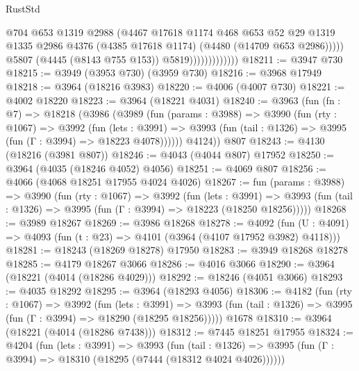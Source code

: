 \begin{lexlean}{RustStd}
\begin{coremodule}
{\begin{coremodule}
{{{{{{{{{{{{{{{{{{{{{{{{{{{{{{{{{{{{{{                                  @704
                                  @653
                                  @1319
                                  @2988
                                  (@4467
                                    @17618
                                    @1174
                                    @468
                                    @653
                                    @52
                                    @29
                                    @1319
                                    @1335
                                    @2986
                                    @4376
                                    (@4385 @17618 @1174)
                                    (@4480 (@14709 @653 @2986)))))
                              @5807
                              (@4445 (@8143 @755 @153))
                              @5819)))))))))))))
@18211 := @3947 @730
@18215 := @3949 (@3953 @730) (@3959 @730)
@18216 := @3968 @17949
@18218 := @3964 (@18216 @3983)
@18220 := @4006 (@4007 @730)
@18221 := @4002 @18220
@18223 := @3964 (@18221 @4031)
@18240 := @3963
    (fun (fn : @7) =>
    @18218
      (@3986
        (@3989
          (fun (params : @3988) =>
          @3990
            (fun (rty : @1067) =>
            @3992
              (fun (lets : @3991) =>
              @3993 (fun (tail : @1326) => @3995 (fun (Γ : @3994) => @18223 @4078))))))
        @4124))
    @807
@18243 := @4130 (@18216 (@3981 @807))
@18246 := @4043 (@4044 @807) @17952
@18250 := @3964 (@4035 (@18246 @4052) @4056)
@18251 := @4069 @807
@18256 := @4066 (@4068 @18251 @17955 @4024 @4026)
@18267 := fun (params : @3988) =>
  @3990
    (fun (rty : @1067) =>
    @3992
      (fun (lets : @3991) =>
      @3993 (fun (tail : @1326) => @3995 (fun (Γ : @3994) => @18223 (@18250 @18256)))))
@18268 := @3989 @18267
@18269 := @3986 @18268
@18278 := @4092
    (fun (U : @4091) => @4093 (fun (t : @23) => @4101 (@3964 (@4107 @17952 @3982) @4118)))
@18281 := @18243 (@18269 @18278) @17950
@18283 := @3949 @18268 @18278
@18285 := @4179 @18267 @3066
@18286 := @4016 @3066
@18290 := @3964 (@18221 (@4014 (@18286 @4029)))
@18292 := @18246 (@4051 @3066)
@18293 := @4035 @18292
@18295 := @3964 (@18293 @4056)
@18306 := @4182
    (fun (rty : @1067) =>
    @3992
      (fun (lets : @3991) =>
      @3993 (fun (tail : @1326) => @3995 (fun (Γ : @3994) => @18290 (@18295 @18256)))))
    @1678
@18310 := @3964 (@18221 (@4014 (@18286 @7438)))
@18312 := @7445 @18251 @17955
@18324 := @4204
    (fun (lets : @3991) =>
    @3993
      (fun (tail : @1326) =>
      @3995 (fun (Γ : @3994) => @18310 (@18295 (@7444 (@18312 @4024 @4026))))))
}}}}}}}}}}}}}}}}}}}}}}}}}}}}}}}}}}}}}}
\end{coremodule}}
\end{coremodule}
\end{lexlean}

